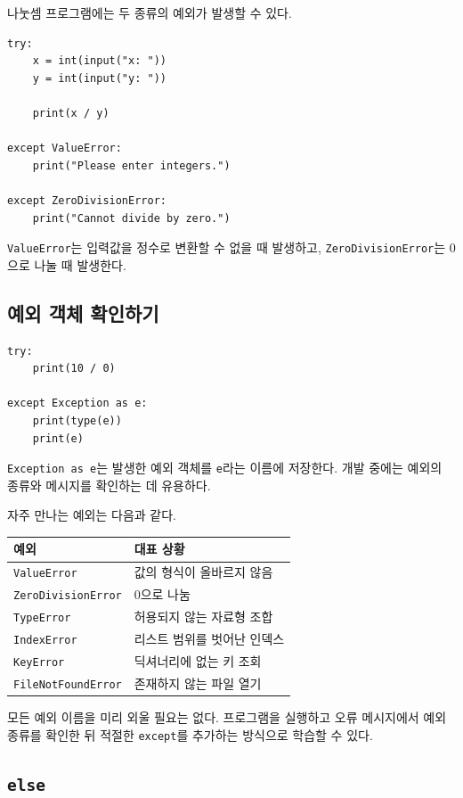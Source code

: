 \documentclass[11pt,a4paper]{article}
\begin{document}
나눗셈 프로그램에는 두 종류의 예외가 발생할 수 있다.

\begin{lstlisting}
try:
    x = int(input("x: "))
    y = int(input("y: "))

    print(x / y)

except ValueError:
    print("Please enter integers.")

except ZeroDivisionError:
    print("Cannot divide by zero.")
\end{lstlisting}

\texttt{ValueError}는 입력값을 정수로 변환할 수 없을 때 발생하고, \texttt{ZeroDivisionError}는 0으로 나눌 때 발생한다.

\subsection{예외 객체 확인하기}

\begin{lstlisting}
try:
    print(10 / 0)

except Exception as e:
    print(type(e))
    print(e)
\end{lstlisting}

\texttt{Exception as e}는 발생한 예외 객체를 \texttt{e}라는 이름에 저장한다. 개발 중에는 예외의 종류와 메시지를 확인하는 데 유용하다.

자주 만나는 예외는 다음과 같다.

\begin{center}
\begin{tabular}{ll}
\toprule
예외 & 대표 상황 \\
\midrule
\texttt{ValueError} & 값의 형식이 올바르지 않음 \\
\texttt{ZeroDivisionError} & 0으로 나눔 \\
\texttt{TypeError} & 허용되지 않는 자료형 조합 \\
\texttt{IndexError} & 리스트 범위를 벗어난 인덱스 \\
\texttt{KeyError} & 딕셔너리에 없는 키 조회 \\
\texttt{FileNotFoundError} & 존재하지 않는 파일 열기 \\
\bottomrule
\end{tabular}
\end{center}

모든 예외 이름을 미리 외울 필요는 없다. 프로그램을 실행하고 오류 메시지에서 예외 종류를 확인한 뒤 적절한 \texttt{except}를 추가하는 방식으로 학습할 수 있다.

\subsection{\texttt{else}}
\end{document}
